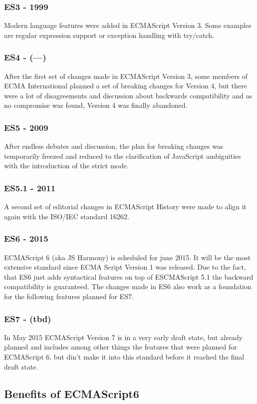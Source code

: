 \documentclass{bioinfo}
\begin{document}
\subsubsection*{\textbf{ES3 - 1999}}
Modern language features were added in ECMAScript Version 3. Some examples are regular expression support or exception handling with try/catch.
\subsubsection*{\textbf{ES4 - (---)}}After the first set of changes made in ECMAScript Version 3, some members of ECMA International planned a set of breaking changes for Version 4, but there were a lot of disagreements and discussion about backwards compatibility and as no compromise was found, Version 4 was finally abandoned. 
\subsubsection*{\textbf{ES5 - 2009}}
After endless debates and discussion, the plan for breaking changes was temporarily freezed and reduced to the clarification of JavaScript ambiguities with the introduction of the strict mode. 
\subsubsection*{\textbf{ES5.1 - 2011}}
A second set of editorial changes in ECMAScript History were made to align it again with the ISO/IEC standard 16262.
\subsubsection*{\textbf{ES6 - 2015}}
ECMAScript 6 (aka JS Harmony) is scheduled for june 2015. It will be the most extensive standard since ECMA Script Version 1 was released. Due to the fact, that ES6 just adds syntactical features on top of ESCMAScript 5.1 the backward compatibility is guaranteed. The changes made in ES6 also work as a foundation for the following features planned for ES7.
\subsubsection*{\textbf{ES7 - (tbd)}}
In May 2015 ECMAScript Version 7 is in a very early draft state, but already planned and includes among other things the features that were planned for ECMAScript 6, but din't make it into this standard before it reached the final draft state. 

\subsection{Benefits of ECMAScript6}
\end{document}
